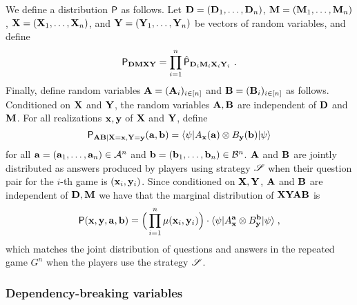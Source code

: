 We define a distribution $\P$ as follows. Let $\bD = (\bD_1,\ldots,\bD_n)$, $\bM = (\bM_1,\ldots,\bM_n)$, $\bX = (\bX_1,\ldots,\bX_n)$, and $\bY = (\bY_1,\ldots,\bY_n)$ be vectors of random variables, and define
\[
	\P_{\bD \bM \bX \bY} = \prod_{i=1}^n \hat{\P}_{\bD_i \bM_i \bX_i \bY_i}~.
\]
Finally, define random variables $\bA = (\bA_i)_{i \in [n]}$ and $\bB = (\bB_i)_{i \in [n]}$ as follows. Conditioned on $\bX$ and $\bY$, the random variables $\bA,\bB$ are independent of $\bD$ and $\bM$. For all realizations $\bx, \by$ of $\bX$ and $\bY$, define
\[
	\P_{\bA \bB | \bX = \bx, \bY = \by}(\ba,\bb) = \bra{\psi} A_\bx(\ba) \otimes B_\by(\bb) \ket{\psi}
\]
for all $\ba = (\ba_1,\ldots,\ba_n) \in \A^n$ and $\bb = (\bb_1,\ldots,\bb_n) \in \B^n$. $\bA$ and $\bB$ are jointly distributed as answers produced by players using strategy $\strategy$ when their question pair for the $i$-th game is $(\bx_i,\by_i)$. 
Since conditioned on $\bX, \bY$, $\bA$ and $\bB$ are independent of $\bD,\bM$ we have that the marginal distribution of $\bX \bY \bA \bB$ is
	\[
		\P(\bx,\by,\ba,\bb) = \Big ( \prod_{i=1}^n \mu(\bx_i,\by_i) \Big) \cdot \bra{\psi} A^{\ba}_\bx \otimes B^{\bb}_\by \ket{\psi}\;,
	\]
	which matches the joint distribution of questions and answers in the repeated game $G^n$ when the players use the strategy $\strategy$.

%
%
%	


\subsubsection{Dependency-breaking variables} 

